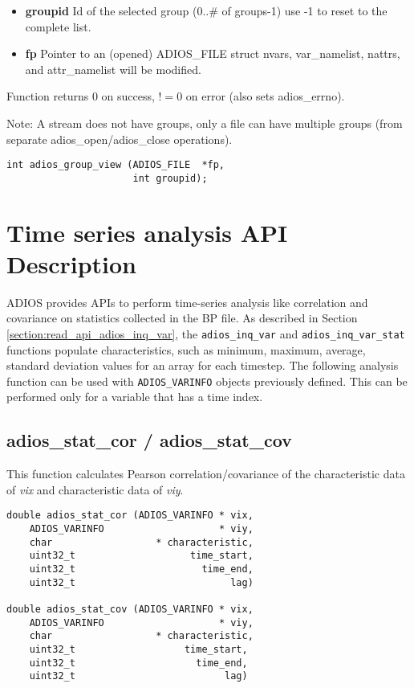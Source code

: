 \begin{itemize}
\item{\bf groupid} Id of the selected group (0..\# of groups-1) use -1 to reset to the complete list.
\item{\bf fp} Pointer to an (opened) ADIOS\_FILE struct nvars, var\_namelist, nattrs, and attr\_namelist will be modified.
\end{itemize}

Function returns 0 on success, $!=0$ on error (also sets adios\_errno).

Note: A stream does not have groups, only a file can have multiple groups 
(from separate adios\_open/adios\_close operations). 

\begin{lstlisting}[alsolanguage=C]
int adios_group_view (ADIOS_FILE  *fp, 
                      int groupid);
\end{lstlisting}


\section{Time series analysis API Description}

ADIOS provides APIs to perform time-series analysis like correlation and covariance 
on statistics collected in the BP file. As described in 
Section \ref{section:read_api_adios_inq_var}, the \verb+adios_inq_var+ and 
\verb+adios_inq_var_stat+ functions
populate characteristics, such as minimum, maximum, average, standard deviation 
values for an array for each timestep. The following analysis function can be used 
with \verb+ADIOS_VARINFO+ objects previously defined. This can be performed only for 
a variable that has a time index.

\subsection{adios\_stat\_cor / adios\_stat\_cov}

This function calculates Pearson correlation/covariance of the characteristic data 
of \textit{vix} and characteristic data of \textit{viy}.

\begin{lstlisting}[]
double adios_stat_cor (ADIOS_VARINFO * vix, 
    ADIOS_VARINFO                    * viy, 
    char                  * characteristic, 
    uint32_t                    time_start, 
    uint32_t                      time_end, 
    uint32_t                           lag)

double adios_stat_cov (ADIOS_VARINFO * vix, 
    ADIOS_VARINFO                    * viy, 
    char                  * characteristic, 
    uint32_t                   time_start, 
    uint32_t                     time_end, 
    uint32_t                          lag)
\end{lstlisting}

